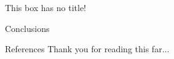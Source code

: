 \documentclass[a3,2col]{ostposter}
\begin{document}
\begin{postercolumn}[0.7]
\begin{posterarea}[2][][0.6]
\begin{postercolumn}[0.6]
			\begin{posterbox}{}
				This box has no title!
			\end{posterbox}
			\begin{posterbox}[posterpurple]{Conclusions}
				\lipsum[6]
			\end{posterbox}
		\end{postercolumn}
	\end{posterarea}
	\begin{posterbox}{References}
		Thank you for reading this far...
	\end{posterbox}
\end{postercolumn}
\end{document}
